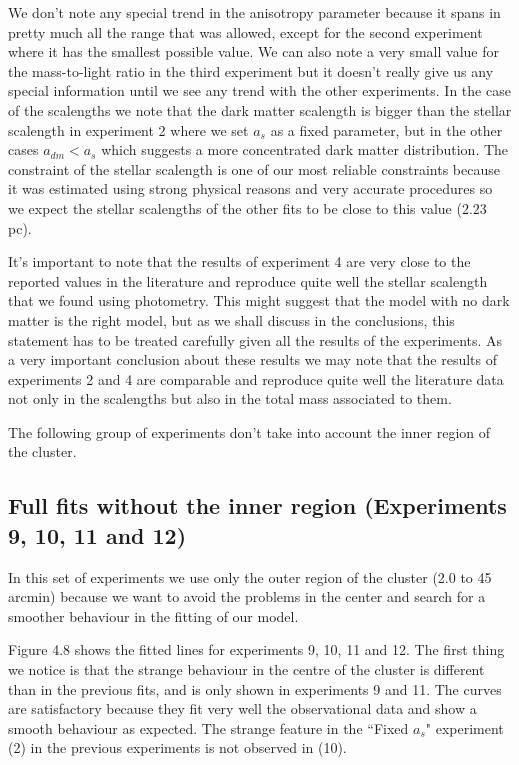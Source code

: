 We don't note any special trend in the anisotropy parameter because it spans in pretty much all the range that was allowed, except for the second experiment where it has the smallest possible value. We can also note a very small value for the mass-to-light ratio in the third experiment but it doesn't really give us any special information until we see any trend with the other experiments. In the case of the scalengths we note that the dark matter scalength is bigger than the stellar scalength in experiment 2 where we set $a_s$ as a fixed parameter, but in the other cases $a_{dm}<a_s$ which suggests a more concentrated dark matter distribution. The constraint of the stellar scalength is one of our most reliable constraints because it was estimated using strong physical reasons and very accurate procedures so we expect the stellar scalengths of the other fits to be close to this value ($2.23$ pc). 

It's important to note that the results of experiment 4 are very close to the reported values in the literature and reproduce quite well the stellar scalength that we found using photometry. This might suggest that the model with no dark matter is the right model, but as we shall discuss in the conclusions, this statement has to be treated carefully given all the results of the experiments. As a very important conclusion about these results we may note that the results of experiments 2 and 4 are comparable and reproduce quite well the literature data not only in the scalengths but also in the total mass associated to them.

The following group of experiments don't take into account the inner region of the cluster.

\subsection{Full fits without the inner region (Experiments 9, 10, 11 and 12)}

In this set of experiments we use only the outer region of the cluster (2.0 to 45 arcmin) because we want to avoid the problems in the center and search for a smoother behaviour in the fitting of our model. 

Figure 4.8 shows the fitted lines for experiments 9, 10, 11 and 12. The first thing we notice is that the strange behaviour in the centre of the cluster is different than in the previous fits, and is only shown in experiments 9 and 11. The curves are satisfactory because they fit very well the observational data and show a smooth behaviour as expected. The strange feature in the ``Fixed $a_s$" experiment (2) in the previous experiments is not observed in (10).

